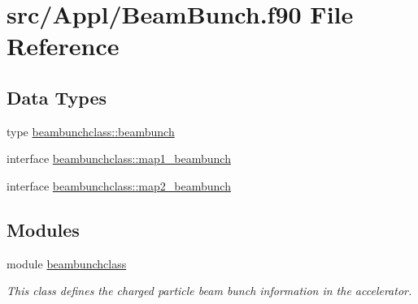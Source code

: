 \hypertarget{_beam_bunch_8f90}{}\section{src/\+Appl/\+Beam\+Bunch.f90 File Reference}
\label{_beam_bunch_8f90}
\subsection*{Data Types}
\begin{DoxyCompactItemize}
\item 
type \mbox{\hyperlink{namespacebeambunchclass_structbeambunchclass_1_1beambunch}{beambunchclass\+::beambunch}}
\item 
interface \mbox{\hyperlink{interfacebeambunchclass_1_1map1__beambunch}{beambunchclass\+::map1\+\_\+beambunch}}
\item 
interface \mbox{\hyperlink{interfacebeambunchclass_1_1map2__beambunch}{beambunchclass\+::map2\+\_\+beambunch}}
\end{DoxyCompactItemize}
\subsection*{Modules}
\begin{DoxyCompactItemize}
\item 
module \mbox{\hyperlink{namespacebeambunchclass}{beambunchclass}}
\begin{DoxyCompactList}\small\item\em This class defines the charged particle beam bunch information in the accelerator. \end{DoxyCompactList}\end{DoxyCompactItemize}
